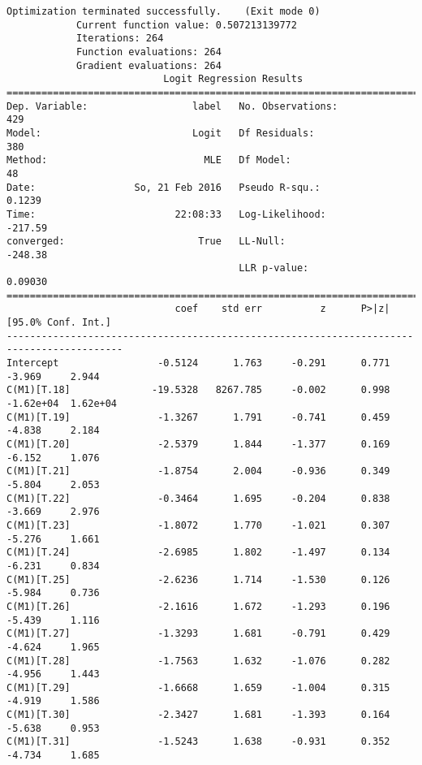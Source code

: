 \documentclass[12pt,fleqn]{article}\usepackage{../common}
\begin{document}
\begin{verbatim}
Optimization terminated successfully.    (Exit mode 0)
            Current function value: 0.507213139772
            Iterations: 264
            Function evaluations: 264
            Gradient evaluations: 264
                           Logit Regression Results                           
==============================================================================
Dep. Variable:                  label   No. Observations:                  429
Model:                          Logit   Df Residuals:                      380
Method:                           MLE   Df Model:                           48
Date:                 So, 21 Feb 2016   Pseudo R-squ.:                  0.1239
Time:                        22:08:33   Log-Likelihood:                -217.59
converged:                       True   LL-Null:                       -248.38
                                        LLR p-value:                   0.09030
==========================================================================================
                             coef    std err          z      P>|z|      [95.0% Conf. Int.]
------------------------------------------------------------------------------------------
Intercept                 -0.5124      1.763     -0.291      0.771        -3.969     2.944
C(M1)[T.18]              -19.5328   8267.785     -0.002      0.998     -1.62e+04  1.62e+04
C(M1)[T.19]               -1.3267      1.791     -0.741      0.459        -4.838     2.184
C(M1)[T.20]               -2.5379      1.844     -1.377      0.169        -6.152     1.076
C(M1)[T.21]               -1.8754      2.004     -0.936      0.349        -5.804     2.053
C(M1)[T.22]               -0.3464      1.695     -0.204      0.838        -3.669     2.976
C(M1)[T.23]               -1.8072      1.770     -1.021      0.307        -5.276     1.661
C(M1)[T.24]               -2.6985      1.802     -1.497      0.134        -6.231     0.834
C(M1)[T.25]               -2.6236      1.714     -1.530      0.126        -5.984     0.736
C(M1)[T.26]               -2.1616      1.672     -1.293      0.196        -5.439     1.116
C(M1)[T.27]               -1.3293      1.681     -0.791      0.429        -4.624     1.965
C(M1)[T.28]               -1.7563      1.632     -1.076      0.282        -4.956     1.443
C(M1)[T.29]               -1.6668      1.659     -1.004      0.315        -4.919     1.586
C(M1)[T.30]               -2.3427      1.681     -1.393      0.164        -5.638     0.953
C(M1)[T.31]               -1.5243      1.638     -0.931      0.352        -4.734     1.685

\end{verbatim}
\end{document}
